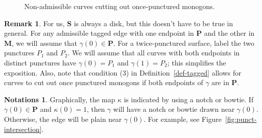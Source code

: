 \documentclass[11pt]{amsart}
\theoremstyle{plain}
\theoremstyle{definition}
\newtheorem{remark}[theorem]{Remark}
\newtheorem{notations}[theorem]{Notations}
\numberwithin{equation}{section}
\def\surf{\mathbf{S}}                       %
\def\PP{\mathbf{P}}
\def\MM{\mathbf{M}}
\begin{document}
\begin{figure}[h]
    \centering
    \caption{Non-admissible curves cutting out once-punctured monogons.}
    \label{fig:monogon}
\end{figure}

\begin{remark}
    For us, $\surf$ is always a disk, but this doesn't have to be true in general.
    For any admissible tagged edge with one endpoint in $\PP$ and the other in $\MM$, we will assume that $\gamma(0) \in \PP$.
    For a twice-punctured surface, label the two punctures $P_1$ and $P_2$.
    We will assume that all curves with both endpoints in distinct punctures have $\gamma(0) = P_1$ and $\gamma(1) = P_2$; this simplifies the exposition.
    Also, note that condition (3) in Definition~\ref{def-tagged} allows for curves to cut out once punctured monogons if both endpoints of $\gamma$ are in $\PP$.
\end{remark}

\begin{notations}
    Graphically, the map $\kappa$ is indicated by using a notch or bowtie. 
    If $\gamma(0) \in \PP$ and $\kappa(0) = 1$, then $\gamma$ will have a notch or bowtie drawn near $\gamma(0)$. 
    Otherwise, the edge will be plain near $\gamma(0)$.
    For example, see Figure~\ref{fig:punct-intersection}.
\end{notations}
\end{document}
